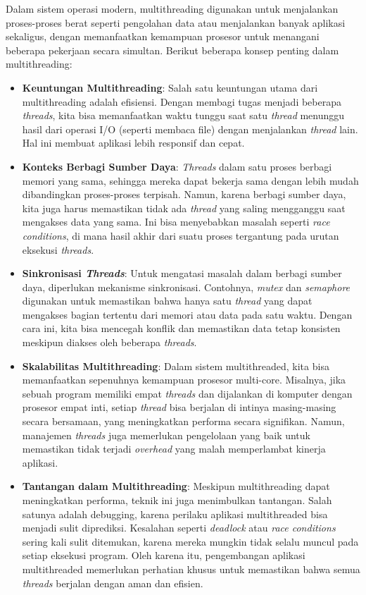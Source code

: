 \documentclass[12pt]{article}
\begin{document}
Dalam sistem operasi modern, multithreading digunakan untuk menjalankan proses-proses berat seperti pengolahan data atau menjalankan banyak aplikasi sekaligus, dengan memanfaatkan kemampuan prosesor untuk menangani beberapa pekerjaan secara simultan. Berikut beberapa konsep penting dalam multithreading:

\begin{itemize}
    \item \textbf{Keuntungan Multithreading}: Salah satu keuntungan utama dari multithreading adalah efisiensi. Dengan membagi tugas menjadi beberapa \textit{threads}, kita bisa memanfaatkan waktu tunggu saat satu \textit{thread} menunggu hasil dari operasi I/O (seperti membaca file) dengan menjalankan \textit{thread} lain. Hal ini membuat aplikasi lebih responsif dan cepat.

    \item \textbf{Konteks Berbagi Sumber Daya}: \textit{Threads} dalam satu proses berbagi memori yang sama, sehingga mereka dapat bekerja sama dengan lebih mudah dibandingkan proses-proses terpisah. Namun, karena berbagi sumber daya, kita juga harus memastikan tidak ada \textit{thread} yang saling mengganggu saat mengakses data yang sama. Ini bisa menyebabkan masalah seperti \textit{race conditions}, di mana hasil akhir dari suatu proses tergantung pada urutan eksekusi \textit{threads}.

    \item \textbf{Sinkronisasi \textit{Threads}}: Untuk mengatasi masalah dalam berbagi sumber daya, diperlukan mekanisme sinkronisasi. Contohnya, \textit{mutex} dan \textit{semaphore} digunakan untuk memastikan bahwa hanya satu \textit{thread} yang dapat mengakses bagian tertentu dari memori atau data pada satu waktu. Dengan cara ini, kita bisa mencegah konflik dan memastikan data tetap konsisten meskipun diakses oleh beberapa \textit{threads}.

    \item \textbf{Skalabilitas Multithreading}: Dalam sistem multithreaded, kita bisa memanfaatkan sepenuhnya kemampuan prosesor multi-core. Misalnya, jika sebuah program memiliki empat \textit{threads} dan dijalankan di komputer dengan prosesor empat inti, setiap \textit{thread} bisa berjalan di intinya masing-masing secara bersamaan, yang meningkatkan performa secara signifikan. Namun, manajemen \textit{threads} juga memerlukan pengelolaan yang baik untuk memastikan tidak terjadi \textit{overhead} yang malah memperlambat kinerja aplikasi.

    \item \textbf{Tantangan dalam Multithreading}: Meskipun multithreading dapat meningkatkan performa, teknik ini juga menimbulkan tantangan. Salah satunya adalah debugging, karena perilaku aplikasi multithreaded bisa menjadi sulit diprediksi. Kesalahan seperti \textit{deadlock} atau \textit{race conditions} sering kali sulit ditemukan, karena mereka mungkin tidak selalu muncul pada setiap eksekusi program. Oleh karena itu, pengembangan aplikasi multithreaded memerlukan perhatian khusus untuk memastikan bahwa semua \textit{threads} berjalan dengan aman dan efisien.
\end{itemize}
\end{document}
